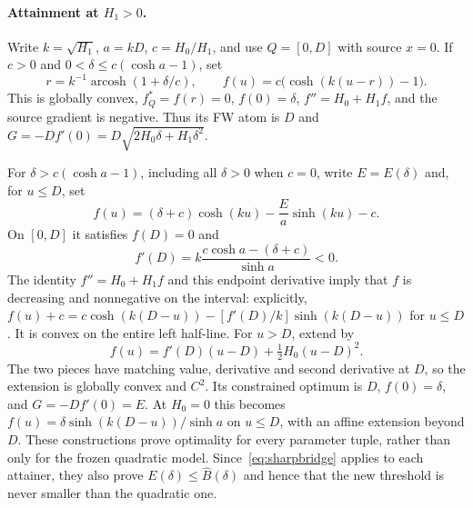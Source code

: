 \paragraph{Attainment at $H_1>0$.}
Write $k=\sqrt{H_1}$, $a=kD$, $c=H_0/H_1$, and use $Q=[0,D]$
with source $x=0$. If $c>0$ and
$0<\delta\le c(\cosh a-1)$, set
\[
 r=k^{-1}\operatorname{arcosh}(1+\delta/c),\qquad
 f(u)=c\big(\cosh(k(u-r))-1\big).
\]
This is globally convex, $f_Q^*=f(r)=0$, $f(0)=\delta$,
$f''=H_0+H_1f$, and the source gradient is negative. Thus its
FW atom is $D$ and
$G=-Df'(0)=D\sqrt{2H_0\delta+H_1\delta^2}$.

For $\delta>c(\cosh a-1)$, including all $\delta>0$ when $c=0$,
write $E=E(\delta)$ and, for $u\le D$, set
\[
 f(u)=(\delta+c)\cosh(ku)-\frac{E}{a}\sinh(ku)-c.
\]
On $[0,D]$ it satisfies $f(D)=0$ and
\[
 f'(D)=k\frac{c\cosh a-(\delta+c)}{\sinh a}<0.
\]
The identity $f''=H_0+H_1f$ and this endpoint derivative imply
that $f$ is decreasing and nonnegative on the interval: explicitly,
$f(u)+c=c\cosh(k(D-u))-[f'(D)/k]\sinh(k(D-u))$ for $u\le D$.
It is convex on the entire left half-line. For $u>D$, extend by
\[
 f(u)=f'(D)(u-D)+\tfrac12H_0(u-D)^2.
\]
The two pieces have matching value, derivative and second derivative
at $D$, so the extension is globally convex and $C^2$.
Its constrained optimum is $D$, $f(0)=\delta$, and
$G=-Df'(0)=E$. At $H_0=0$ this becomes
$f(u)=\delta\sinh(k(D-u))/\sinh a$ on $u\le D$, with an affine
extension beyond $D$. These constructions prove optimality for
every parameter tuple, rather than only for the frozen quadratic model.
Since~\eqref{eq:sharpbridge} applies to each attainer, they also
prove $E(\delta)\le\widehat B(\delta)$ and hence that the new
threshold is never smaller than the quadratic one.

